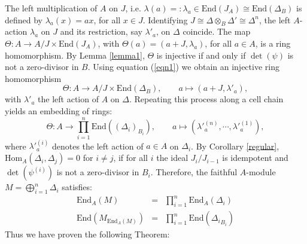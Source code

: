 \documentclass[oneside, a4paper, 11pt]{amsart}
\newcommand{\End}{\mathrm{End}}
\newcommand{\Hom}{\mathrm{Hom}}
\begin{document}
The left multiplication of $A$ on $J$, i.e. $\lambda(a)=:\lambda_a\in \End(J_A) \cong \End(\Delta_B)$ is defined by $\lambda_a(x)=ax$, for all $x\in J$. 
Identifying $J\cong  \Delta \otimes_B \Delta' \cong \Delta^n$, the left $A$-action $\lambda_a$ on $J$ and its restriction, say $\lambda'_a$, on $\Delta$ coincide. 
The map $\Theta:A\to A/J\times \End(J_A)$, with $\Theta(a) = (a+J, \lambda_a)$, for all $a\in A$, is a ring homomorphism. By Lemma \ref{lemma1}, $\Theta$ is injective if and only if $\det(\psi)$ is not a zero-divisor in $B$. Using equation (\ref{eqn1}) we obtain an injective ring homomorphism
$$\Theta:A \to A/J \times \End(\Delta_B),\qquad  a \mapsto (a+J, \lambda'_a),$$
with $\lambda'_a$ the left action of $A$ on $\Delta$. Repeating this process along a cell chain yields an embedding of rings:
$$\Theta:A \to \prod_{i=1}^n \End( (\Delta_i)_{B_i}), \qquad a \mapsto (\lambda'^{(n)}_a, \cdots , \lambda'^{(1)}_a),$$
where $\lambda'^{(i)}_a$ denotes the left action of $a\in A$ on $\Delta_i$.
By Corollary \ref{regular}, $\Hom_A(\Delta_i,\Delta_j)=0$ for $i\neq j$, if for all $i$ the ideal $J_i/J_{i-1}$ is idempotent and $\det(\psi^{(i)})$ is not a zero-divisor in $B_i$. Therefore, the faithful $A$-module $M=\bigoplus_{i=1}^n \Delta_i$ satisfies:
\begin{eqnarray}
\End_A(M)&=&\prod_{i=1}^n \End_A(\Delta_i)\\
 \End(M_{\End_A(M)}) &=& \prod_{i=1}^n \End( {\Delta_i}_{B_i})
\end{eqnarray}
Thus we have proven the following Theorem:
\end{document}
